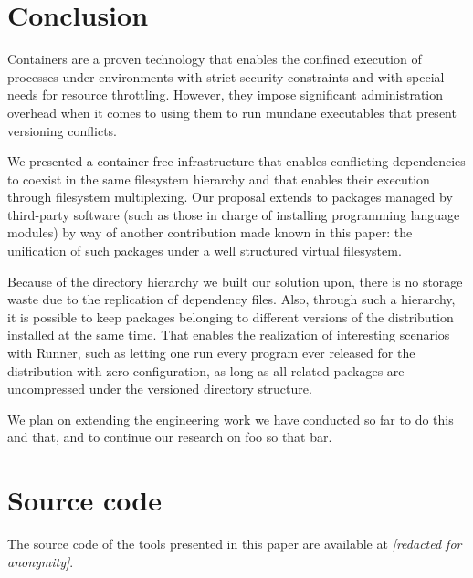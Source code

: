 \documentclass[sigplan, anonymous, 10pt]{acmart}
\begin{document}
\section{Conclusion}\label{sec:conclusion}
Containers are a proven technology that enables the confined execution of
processes under environments with strict security constraints and with special
needs for resource throttling. However, they impose significant administration
overhead when it comes to using them to run mundane executables that present
versioning conflicts.

We presented a container-free infrastructure that enables conflicting
dependencies to coexist in the same filesystem hierarchy and that enables
their execution through filesystem multiplexing. Our proposal extends to
packages managed by third-party software (such as those in charge of
installing programming language modules) by way of another contribution
made known in this paper: the unification of such packages under a well
structured virtual filesystem.

Because of the directory hierarchy we built our solution upon, there is
no storage waste due to the replication of dependency files. Also, through
such a hierarchy, it is possible to keep packages belonging to different
versions of the distribution installed at the same time. That enables the
realization of interesting scenarios with Runner, such as letting one run
every program ever released for the distribution with zero configuration,
as long as all related packages are uncompressed under the versioned
directory structure.

We plan on extending the engineering work we have conducted so far to
do this and that, and to continue our research on foo so that bar.

\section{Source code}
The source code of the tools presented in this paper are available at
\emph{[redacted for anonymity]}.



\end{document}

